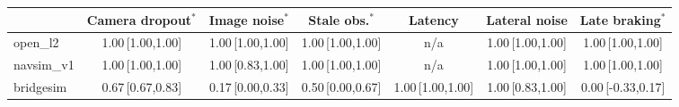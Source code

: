 \begin{tabular}{@{}lcccccc@{}}
\toprule
 & Camera dropout$^{\ast}$ & Image noise$^{\ast}$ & Stale obs.$^{\ast}$ & Latency & Lateral noise & Late braking$^{\ast}$ \\
\midrule
open\_l2 & 1.00\,{\scriptsize[1.00,1.00]} & 1.00\,{\scriptsize[1.00,1.00]} & 1.00\,{\scriptsize[1.00,1.00]} & n/a & 1.00\,{\scriptsize[1.00,1.00]} & 1.00\,{\scriptsize[1.00,1.00]} \\
navsim\_v1 & 1.00\,{\scriptsize[1.00,1.00]} & 1.00\,{\scriptsize[0.83,1.00]} & 1.00\,{\scriptsize[1.00,1.00]} & n/a & 1.00\,{\scriptsize[1.00,1.00]} & 1.00\,{\scriptsize[1.00,1.00]} \\
bridgesim & 0.67\,{\scriptsize[0.67,0.83]} & 0.17\,{\scriptsize[0.00,0.33]} & 0.50\,{\scriptsize[0.00,0.67]} & 1.00\,{\scriptsize[1.00,1.00]} & 1.00\,{\scriptsize[0.83,1.00]} & 0.00\,{\scriptsize[-0.33,0.17]} \\
\bottomrule
\end{tabular}
